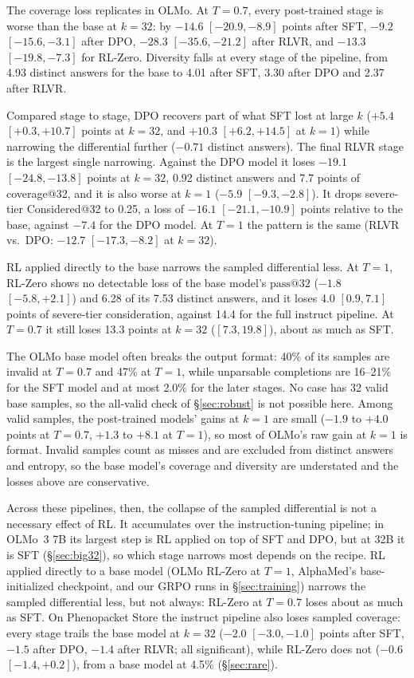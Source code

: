 \documentclass[11pt]{article}
\makeatletter
\newcommand{\passk}[1]{\mathrm{pass@}#1}
\makeatother
\begin{document}
The coverage loss replicates in OLMo. At $T{=}0.7$, every post-trained stage is worse than the base at $k{=}32$: by $-14.6$ $[-20.9,-8.9]$ points after SFT, $-9.2$ $[-15.6,-3.1]$ after DPO, $-28.3$ $[-35.6,-21.2]$ after RLVR, and $-13.3$ $[-19.8,-7.3]$ for RL-Zero. Diversity falls at every stage of the pipeline, from 4.93 distinct answers for the base to 4.01 after SFT, 3.30 after DPO and 2.37 after RLVR.

Compared stage to stage, DPO recovers part of what SFT lost at large $k$ ($+5.4$ $[+0.3,+10.7]$ points at $k{=}32$, and $+10.3$ $[+6.2,+14.5]$ at $k{=}1$) while narrowing the differential further ($-0.71$ distinct answers).
The final RLVR stage is the largest single narrowing. Against the DPO model it loses $-19.1$ $[-24.8,-13.8]$ points at $k{=}32$, 0.92 distinct answers and 7.7 points of coverage@32, and it is also worse at $k{=}1$ ($-5.9$ $[-9.3,-2.8]$). It drops severe-tier Considered@32 to 0.25, a loss of $-16.1$ $[-21.1,-10.9]$ points relative to the base, against $-7.4$ for the DPO model. At $T{=}1$ the pattern is the same (RLVR vs.\ DPO: $-12.7$ $[-17.3,-8.2]$ at $k{=}32$).

RL applied directly to the base narrows the sampled differential less. At $T{=}1$, RL-Zero shows no detectable loss of the base model's $\passk{32}$ ($-1.8$ $[-5.8,+2.1]$) and 6.28 of its 7.53 distinct answers, and it loses 4.0 $[0.9,7.1]$ points of severe-tier consideration, against 14.4 for the full instruct pipeline. At $T{=}0.7$ it still loses 13.3 points at $k{=}32$ ($[7.3,19.8]$), about as much as SFT.

The OLMo base model often breaks the output format: 40\% of its samples are invalid at $T{=}0.7$ and 47\% at $T{=}1$, while unparsable completions are 16--21\% for the SFT model and at most 2.0\% for the later stages. No case has 32 valid base samples, so the all-valid check of \S\ref{sec:robust} is not possible here. Among valid samples, the post-trained models' gains at $k{=}1$ are small ($-1.9$ to $+4.0$ points at $T{=}0.7$, $+1.3$ to $+8.1$ at $T{=}1$), so most of OLMo's raw gain at $k{=}1$ is format. Invalid samples count as misses and are excluded from distinct answers and entropy, so the base model's coverage and diversity are understated and the losses above are conservative.

Across these pipelines, then, the collapse of the sampled differential is not a necessary effect of RL. It accumulates over the instruction-tuning pipeline; in OLMo~3 7B its largest step is RL applied on top of SFT and DPO, but at 32B it is SFT (\S\ref{sec:big32}), so which stage narrows most depends on the recipe. RL applied directly to a base model (OLMo RL-Zero at $T{=}1$, AlphaMed's base-initialized checkpoint, and our GRPO runs in \S\ref{sec:training}) narrows the sampled differential less, but not always: RL-Zero at $T{=}0.7$ loses about as much as SFT.
On Phenopacket Store the instruct pipeline also loses sampled coverage: every stage trails the base model at $k{=}32$ ($-2.0$ $[-3.0,-1.0]$ points after SFT, $-1.5$ after DPO, $-1.4$ after RLVR; all significant), while RL-Zero does not ($-0.6$ $[-1.4,+0.2]$), from a base model at 4.5\% (\S\ref{sec:rare}).
\end{document}

